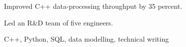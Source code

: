 \documentclass[fontsize=11pt]{careerdossier-resume}
\begin{document}
\MakeCDossierHeader

\begin{CDossierEntry}[
  title        = {Senior Research and Development Engineer},
  organization = {Northstar Analytics Inc.},
  location     = {Toronto, Ontario},
  dates        = {January 2023 -- Present}
]
  \begin{CDossierItemize}
    \item Improved C++ data-processing throughput by 35 percent.
    \item Led an R\&D team of five engineers.
  \end{CDossierItemize}
\end{CDossierEntry}

C++, Python, SQL, data modelling, technical writing
\end{document}
